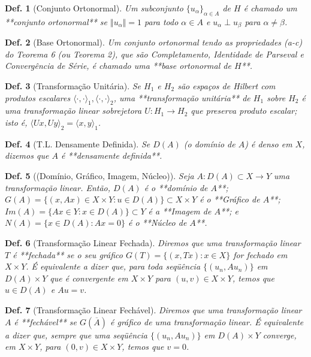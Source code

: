 \documentclass[11pt]{article}
\theoremstyle{yellowhead}
\theoremstyle{yellowdef}
\newtheorem*{definition}{Def.}
\begin{document}
\begin{multicols}{3}
\begin{definition}[Conjunto Ortonormal]
Um subconjunto $\{u_{\alpha}\}_{\alpha \in A}$ de $H$ é chamado um **conjunto ortonormal** se $\Vert u_{\alpha} \Vert = 1$ para todo $\alpha \in A$ e $u_{\alpha} \perp u_{\beta}$ para $\alpha \ne \beta$.
\end{definition}

\begin{definition}[Base Ortonormal]
Um conjunto ortonormal tendo as propriedades (a-c) do Teorema 6 (ou Teorema 2), que são Completamento, Identidade de Parseval e Convergência de Série, é chamado uma **base ortonormal de $H$**.
\end{definition}

\begin{definition}[Transformação Unitária]
Se $H_1$ e $H_2$ são espaços de Hilbert com produtos escalares $\langle \cdot, \cdot \rangle_1, \langle \cdot, \cdot \rangle_2$, uma **transformação unitária** de $H_1$ sobre $H_2$ é uma transformação linear sobrejetora $U : H_1 \rightarrow H_2$ que preserva produto escalar; isto é, $\langle Ux, Uy \rangle_2 = \langle x, y \rangle_1$.
\end{definition}

\begin{definition}[T.L. Densamente Definida]
Se $D(A)$ (o domínio de $A$) é denso em $X$, dizemos que $A$ é **densamente definida**.
\end{definition}

\begin{definition}[(Domínio, Gráfico, Imagem, Núcleo)]
Seja $A : D(A) \subset X \rightarrow Y$ uma transformação linear. Então, $D(A)$ é o **domínio de $A$**; $G(A) = \{(x ,Ax) \in X \times Y : u \in D(A)\} \subset X \times Y$ é o **Gráfico de $A$**; $Im(A) = \{Ax \in Y : x \in D(A)\} \subset Y$ é a **Imagem de $A$**; e $N(A) = \{x \in D(A) : Ax = 0\}$ é o **Núcleo de $A$**.
\end{definition}

\begin{definition}[Transformação Linear Fechada]
Diremos que uma transformação linear $T$ é **fechada** se o seu gráfico $G(T) = \{(x, Tx) : x \in X\}$ for fechado em $X \times Y$. É equivalente a dizer que, para toda seqüência $\{(u_n, Au_n)\}$ em $D(A) \times Y$ que é convergente em $X \times Y$ para $(u, v) \in X \times Y$, temos que $u \in D(A)$ e $Au = v$.
\end{definition}

\begin{definition}[Transformação Linear Fechável]
Diremos que uma transformação linear $A$ é **fechável** se $G(\overline{A})$ é gráfico de uma transformação linear. É equivalente a dizer que, sempre que uma seqüência $\{(u_n, Au_n)\}$ em $D(A) \times Y$ converge, em $X \times Y$, para $(0, v) \in X \times Y$, temos que $v = 0$.
\end{definition}


\end{multicols}
\end{document}
